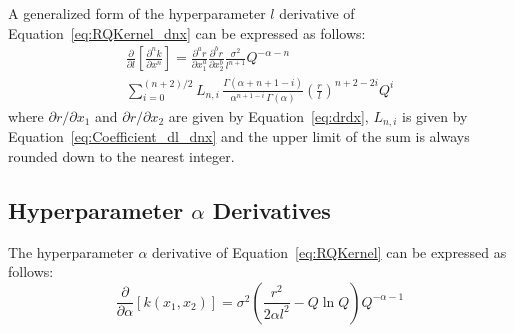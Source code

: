 \documentclass{article}
\begin{document}
A generalized form of the hyperparameter $l$ derivative of Equation~\eqref{eq:RQKernel_dnx} can be expressed as follows:
\begin{multline}
\label{eq:RQKernel_dl_dnx}
	\frac{\partial}{\partial l} \left[\frac{\partial^n k}{\partial x^n}\right] = \frac{\partial^a r}{\partial x_1^a} \frac{\partial^b r}{\partial x_2^b} \frac{\sigma^2}{l^{n+1}} Q^{-\alpha - n} \\
	\sum_{i=0}^{\left(n+2\right)/2} L_{n,i} \, \frac{\Gamma\!\left(\alpha + n + 1 - i\right)}{\alpha^{n+1-i} \, \Gamma\!\left(\alpha\right)} \left(\frac{r}{l}\right)^{n+2-2i} Q^i
\end{multline}
where $\partial r/\partial x_1$ and $\partial r/\partial x_2$ are given by Equation~\eqref{eq:drdx}, $L_{n,i}$ is given by Equation~\eqref{eq:Coefficient_dl_dnx} and the upper limit of the sum is always rounded down to the nearest integer.

\subsection{Hyperparameter $\alpha$ Derivatives}
\label{subsec:RQHypDer_a}

The hyperparameter $\alpha$ derivative of Equation~\eqref{eq:RQKernel} can be expressed as follows:
\begin{equation}
\label{eq:RQKernel_da}
	\frac{\partial}{\partial \alpha} \left[k\!\left(x_1,x_2\right)\right] = \sigma^2 \left(\frac{r^2}{2 \alpha l^2} - Q \ln{Q}\right) Q^{-\alpha-1}
\end{equation}

\begin{comment}
\begin{equation}
\label{eq:RQKernel_da_d1x}
	\begin{gathered}
	\frac{\partial}{\partial \alpha} \left[\frac{\partial k\!\left(x_1,x_2\right)}{\partial x_1}\right] = - \frac{\partial r}{\partial x_1} \frac{\sigma^2 r}{l^2} \left(\frac{r^2}{l^2} \frac{\alpha + 1}{\alpha^2 z} - \ln{z}\right) z^{-\alpha - 1} \\
	\frac{\partial}{\partial l} \left[\frac{\partial k\!\left(x_1,x_2\right)}{\partial x_2}\right] = - \frac{\partial r}{\partial x_2} \frac{\sigma^2 r}{l^2} \left(\frac{r^2}{l^2} \frac{\alpha + 1}{\alpha^2 z} - \ln{z}\right) z^{-\alpha - 1}
	\end{gathered}
\end{equation}

\begin{multline}
\label{eq:RQKernel_da_d2x}
	\frac{\partial}{\partial l} \left[\frac{\partial^2 k\!\left(x_1,x_2\right)}{\partial x_1 \partial x_2}\right] =  \frac{\partial r}{\partial x_1} \frac{\partial r}{\partial x_2} \frac{\sigma^2}{l^2} \\
	\left[\left(\frac{r^2}{l^2} \frac{2\alpha + 1}{2\alpha} - 1\right) \left(\frac{r^2}{l^2} \frac{\alpha + 2}{\alpha^2 z} - \ln{z}\right) - \frac{r^2 z}{2 \alpha^2 l^2}\right] z^{-\alpha - 2}
\end{multline}
\end{comment}
\end{document}
